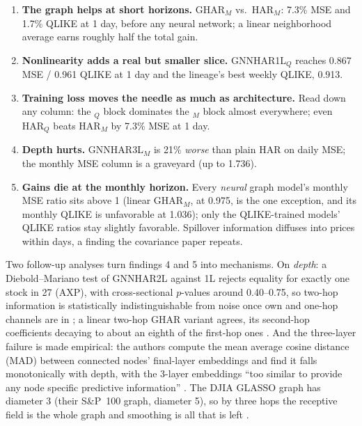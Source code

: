 \begin{keyresult}
\begin{enumerate}[nosep]
  \item \textbf{The graph helps at short horizons.} GHAR$_M$ vs.\ HAR$_M$: 7.3\% MSE and 1.7\% QLIKE at 1 day, before any neural network; a linear neighborhood average earns roughly half the total gain.
  \item \textbf{Nonlinearity adds a real but smaller slice.} GNNHAR1L$_Q$ reaches 0.867 MSE / 0.961 QLIKE at 1 day and the lineage's best weekly QLIKE, 0.913.
  \item \textbf{Training loss moves the needle as much as architecture.} Read down any column: the $_Q$ block dominates the $_M$ block almost everywhere; even HAR$_Q$ beats HAR$_M$ by 7.3\% MSE at 1 day.
  \item \textbf{Depth hurts.} GNNHAR3L$_M$ is 21\% \emph{worse} than plain HAR on daily MSE; the monthly MSE column is a graveyard (up to 1.736).
  \item \textbf{Gains die at the monthly horizon.} Every \emph{neural} graph model's monthly MSE ratio sits above 1 (linear GHAR$_M$, at 0.975, is the one exception, and its monthly QLIKE is unfavorable at 1.036); only the QLIKE-trained models' QLIKE ratios stay slightly favorable. Spillover information diffuses into prices within days, a finding the covariance paper repeats.
\end{enumerate}
\end{keyresult}

Two follow-up analyses turn findings 4 and 5 into mechanisms. On \emph{depth}: a Diebold--Mariano test of GNNHAR2L against 1L rejects equality for exactly one stock in 27 (AXP), with cross-sectional $p$-values around 0.40--0.75, so two-hop information is statistically indistinguishable from noise once own and one-hop channels are in \citep[Fig.~7, pp.~22--23]{ZhangCucuringuDong2023}; a linear two-hop GHAR variant agrees, its second-hop coefficients decaying to about an eighth of the first-hop ones \citep[App.~C, pp.~35--37]{ZhangCucuringuDong2023}. And the three-layer failure is  made empirical: the authors compute the mean average cosine distance (MAD) between connected nodes' final-layer embeddings and find it falls monotonically with depth, with the 3-layer embeddings ``too similar to provide any node specific predictive information'' \citep[Fig.~8, p.~24]{ZhangCucuringuDong2023}. The DJIA GLASSO graph has diameter 3 (their S\&P~100 graph, diameter 5), so by three hops the receptive field is the whole graph and smoothing is all that is left \citep[Table~A.2, p.~34]{ZhangCucuringuDong2023}.

